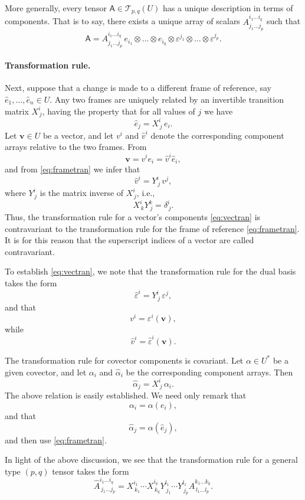 \documentclass[12pt]{article}
\newcommand{\Uspace}{U}
\newcommand{\veps}{\varepsilon}
\newcommand{\cT}{\mathcal{T}}
\newcommand{\bA}{\mathsf{A}}
\newcommand{\ve}{e}
\newcommand{\bv}{\mathbf{v}}
\newcommand{\hv}{\hat{v}}
\newcommand{\hA}{\hat{A}}
\newcommand{\halpha}{\hat{\alpha}}
\newcommand{\hbe}{\hat{\ve}}
\newcommand{\hve}{\hat{\veps}}
\newcommand{\bal}{\alpha}
\begin{document}
More generally, every tensor $\bA\in\cT_{p,q}(\Uspace)$ has a unique
description in terms of components.  That is to say, there exists a
unique array of scalars $A^{i_1\ldots i_q}_{j_1\ldots j_p}$ such that
$$\bA = A^{i_1\ldots i_q}_{j_1\ldots j_p}\, \ve_{i_1} \otimes
\ldots\otimes \ve_{i_q} \otimes \veps^{j_1}\otimes\ldots\otimes \veps^{j_p}.$$

\paragraph{Transformation rule.}
Next, suppose that a change is made to a  different frame of
reference, say
$\hbe_1,\ldots,\hbe_n\in\Uspace.$
Any two frames are uniquely related by
an invertible transition matrix $X^i_{\,j}$, having the property that for
all values of $j$ we have
\begin{equation}
  \label{eq:frametran}
  \hbe_j = X^i_{\,j}\, \ve_i.  
\end{equation}
Let $\bv\in\Uspace$ be a  vector, and let $v^i$
and $\hv^i$ denote the corresponding component arrays relative to
the two frames.  From 
$$\bv = v^i\ve_i = \hv^i\hbe_i,$$
and from \eqref{eq:frametran} we infer that
\begin{equation}
  \label{eq:vectran}
  \hv^i = Y^i_{\,j}\, v^j,  
\end{equation}
where $Y^i_{\,j}$ is the matrix inverse of $X^i_{\,j}$, i.e.,
$$X^i_{\,k} Y^k_{\,j } = \delta^i_{\,j}.$$
Thus, the
transformation rule for a vector's components \eqref{eq:vectran} is
contravariant to the transformation rule for the frame of reference
\eqref{eq:frametran}.  It is for this reason that the superscript
indices of a vector are called contravariant.

To establish \eqref{eq:vectran}, we note that the transformation rule
for the dual basis takes the form
$$\hve^i = Y^i_{\,j}\, \veps^j,$$
and that
$$v^i = \veps^i(\bv),$$
while
$$\hv^i = \hve^i(\bv).$$

The transformation rule for covector components is covariant.  Let
$\bal\in \Uspace^*$ be a given covector, and let $\alpha_i$ and
$\halpha_i$ be the corresponding component arrays. Then
$$\halpha_j = X^i_{\,j}\, \alpha_i.$$
The above relation is easily established.  We need only remark that
$$\alpha_i = \bal(\ve_i),$$
and that
$$\halpha_j = \bal(\hbe_j),$$
and then use \eqref{eq:frametran}.

In light of the above discussion, we see that the transformation rule
for a general type $(p,q)$ tensor takes the form
$$\hA^{i_1\ldots i_q}_{\,j_1\ldots j_p} =
X^{i_1}_{\,k_1}\cdots X^{i_q}_{\,k_q}
Y^{l_1}_{\,j_1}\cdots Y^{l_1}_{\,j_p}
A^{k_1\ldots k_q}_{\,l_1\ldots l_p}.
$$
\end{document}
